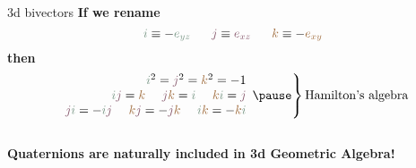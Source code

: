 \begin{frame}{3d bivectors}
    \centering
    \Large
    \textbf{If we rename}
    $$
        \textcolor{midgreenblue}{i} \equiv -\textcolor{midgreenblue}{e_{yz}}~~~~~
        \textcolor{midredblue}{j} \equiv \textcolor{midredblue}{e_{xz}}~~~~~
        \textcolor{midredgreen}{k} \equiv -\textcolor{midredgreen}{e_{xy}}
    $$
    \textbf{then}
    \renewcommand\arraystretch{1.5}
    $$
        \left.
        \begin{array}{r}
            \textcolor{midgreenblue}{i}^2  = \textcolor{midredblue}{j}^2 = \textcolor{midredgreen}{k}^2 = -1 \\
            \textcolor{midgreenblue}{i}\textcolor{midredblue}{j}=\textcolor{midredgreen}{k} ~~~~
            \textcolor{midredblue}{j}\textcolor{midredgreen}{k}=\textcolor{midgreenblue}{i} ~~~~
            \textcolor{midredgreen}{k}\textcolor{midgreenblue}{i}=\textcolor{midredblue}{j}                  \\
            \textcolor{midredblue}{j}\textcolor{midgreenblue}{i}=-\textcolor{midgreenblue}{i}\textcolor{midredblue}{j} ~~~~
            \textcolor{midredgreen}{k}\textcolor{midredblue}{j}=-\textcolor{midredblue}{j}\textcolor{midredgreen}{k} ~~~~
            \textcolor{midgreenblue}{i}\textcolor{midredgreen}{k}=-\textcolor{midredgreen}{k}\textcolor{midgreenblue}{i}
        \end{array}
        \pause
        \right\rbrace
        \text{Hamilton's algebra}
    $$
    \renewcommand\arraystretch{1.0}
    \pause
    ~\\
    \textbf{Quaternions are naturally included in 3d Geometric Algebra!}
\end{frame}
